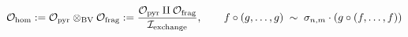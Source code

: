 \documentclass[preview]{standalone}
\begin{document}
\begin{align*}
\special{dvisvgm:raw <g id='unique000'>}\mathcal{O}_{\text{hom}} := \mathcal{O}_{\text{pyr}} \otimes_{\text{BV}} \mathcal{O}_{\text{frag}} := \frac{\mathcal{O}_{\text{pyr}} \amalg \mathcal{O}_{\text{frag}}}{\mathcal{I}_{\text{exchange}}}, \qquad f \circ (g,\dots,g) \;\sim\; \sigma_{n,m} \cdot \left(g \circ (f,\dots,f)\right)\special{dvisvgm:raw </g>}
\end{align*}
\end{document}
